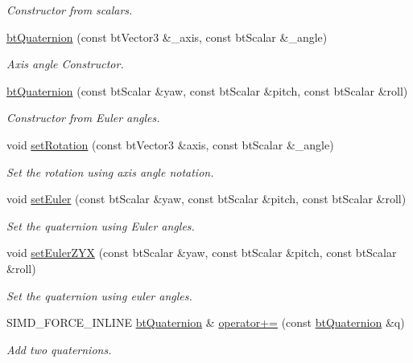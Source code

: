 \begin{DoxyCompactItemize}
\begin{DoxyCompactList}\small\item\em Constructor from scalars. \end{DoxyCompactList}\item 
\hyperlink{classbt_quaternion_a2b2e9ed0014eb26ed076808fb76e9d69}{bt\+Quaternion} (const bt\+Vector3 \&\+\_\+axis, const bt\+Scalar \&\+\_\+angle)
\begin{DoxyCompactList}\small\item\em Axis angle Constructor. \end{DoxyCompactList}\item 
\hyperlink{classbt_quaternion_a8bd5d699377ba585749d325076616ffb}{bt\+Quaternion} (const bt\+Scalar \&yaw, const bt\+Scalar \&pitch, const bt\+Scalar \&roll)
\begin{DoxyCompactList}\small\item\em Constructor from Euler angles. \end{DoxyCompactList}\item 
void \hyperlink{classbt_quaternion_ade840b704d06ad0092b996b432b8a8a6}{set\+Rotation} (const bt\+Vector3 \&axis, const bt\+Scalar \&\+\_\+angle)
\begin{DoxyCompactList}\small\item\em Set the rotation using axis angle notation. \end{DoxyCompactList}\item 
void \hyperlink{classbt_quaternion_aed0a6469d6c6c1e379f1143ad62b3439}{set\+Euler} (const bt\+Scalar \&yaw, const bt\+Scalar \&pitch, const bt\+Scalar \&roll)
\begin{DoxyCompactList}\small\item\em Set the quaternion using Euler angles. \end{DoxyCompactList}\item 
void \hyperlink{classbt_quaternion_a808b430136b4a8d1e7120134af14a1ff}{set\+Euler\+Z\+Y\+X} (const bt\+Scalar \&yaw, const bt\+Scalar \&pitch, const bt\+Scalar \&roll)
\begin{DoxyCompactList}\small\item\em Set the quaternion using euler angles. \end{DoxyCompactList}\item 
S\+I\+M\+D\+\_\+\+F\+O\+R\+C\+E\+\_\+\+I\+N\+L\+I\+N\+E \hyperlink{classbt_quaternion}{bt\+Quaternion} \& \hyperlink{classbt_quaternion_a1212e4cbaa71da187984d3c174a4cc04}{operator+=} (const \hyperlink{classbt_quaternion}{bt\+Quaternion} \&q)
\begin{DoxyCompactList}\small\item\em Add two quaternions. \end{DoxyCompactList}\item 

\end{DoxyCompactItemize}
